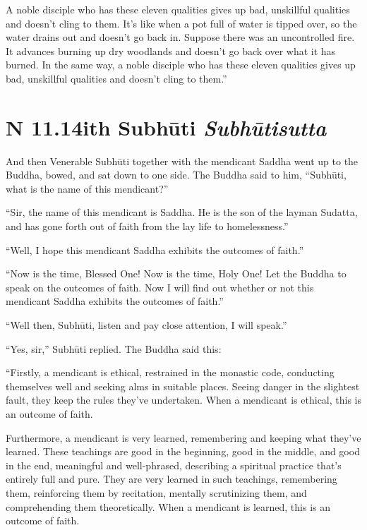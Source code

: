 \documentclass[12pt,openany]{book}%
\newcommand*{\suttatitleacronym}[1]{\smaller[2]{#1}\vspace*{.3em}}
\newcommand*{\suttatitletranslation}[1]{\linebreak{#1}}
\newcommand*{\suttatitleroot}[1]{\linebreak\smaller[2]\itshape{#1}}
\newcommand*{\tocacronym}[1]{\hspace*{-3.3em}{#1}\quad}
\newcommand*{\toctranslation}[1]{#1}
\newcommand*{\tocroot}[1]{(\textit{#1})}
\begin{document}
A noble disciple who has these eleven qualities gives up bad, unskillful qualities and doesn’t cling to them. It’s like when a pot full of water is tipped over, so the water drains out and doesn’t go back in. Suppose there was an uncontrolled fire. It advances burning up dry woodlands and doesn’t go back over what it has burned. In the same way, a noble disciple who has these eleven qualities gives up bad, unskillful qualities and doesn’t cling to them.” 

%
\section*{{\suttatitleacronym AN 11.14}{\suttatitletranslation With Subhūti }{\suttatitleroot Subhūtisutta}}
\addcontentsline{toc}{section}{\tocacronym{AN 11.14} \toctranslation{With Subhūti } \tocroot{Subhūtisutta}}

And then Venerable \textsanskrit{Subhūti} together with the mendicant Saddha went up to the Buddha, bowed, and sat down to one side. The Buddha said to him, “\textsanskrit{Subhūti}, what is the name of this mendicant?” 

“Sir, the name of this mendicant is Saddha. He is the son of the layman Sudatta, and has gone forth out of faith from the lay life to homelessness.” 

“Well, I hope this mendicant Saddha exhibits the outcomes of faith.” 

“Now is the time, Blessed One! Now is the time, Holy One! Let the Buddha to speak on the outcomes of faith. Now I will find out whether or not this mendicant Saddha exhibits the outcomes of faith.” 

“Well then, \textsanskrit{Subhūti}, listen and pay close attention, I will speak.” 

“Yes, sir,” \textsanskrit{Subhūti} replied. The Buddha said this: 

“Firstly, a mendicant is ethical, restrained in the monastic code, conducting themselves well and seeking alms in suitable places. Seeing danger in the slightest fault, they keep the rules they’ve undertaken. When a mendicant is ethical, this is an outcome of faith. 

Furthermore, a mendicant is very learned, remembering and keeping what they’ve learned. These teachings are good in the beginning, good in the middle, and good in the end, meaningful and well-phrased, describing a spiritual practice that’s entirely full and pure. They are very learned in such teachings, remembering them, reinforcing them by recitation, mentally scrutinizing them, and comprehending them theoretically. When a mendicant is learned, this is an outcome of faith. 
\end{document}
